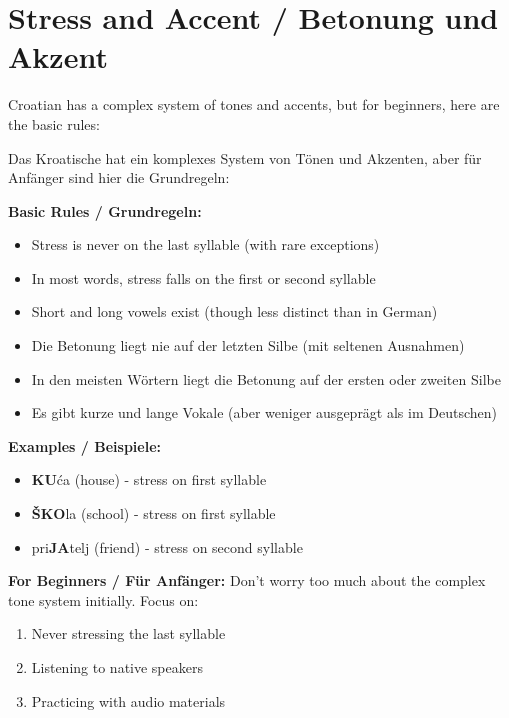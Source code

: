 \section{Stress and Accent / Betonung und Akzent}

\begin{tcolorbox}[colback=white, colframe=croatianred, title=\textbf{Word Stress / Wortbetonung}]

Croatian has a complex system of tones and accents, but for beginners, here are the basic rules:

Das Kroatische hat ein komplexes System von Tönen und Akzenten, aber für Anfänger sind hier die Grundregeln:

\textbf{Basic Rules / Grundregeln:}
\begin{itemize}
    \item Stress is never on the last syllable (with rare exceptions)
    \item In most words, stress falls on the first or second syllable
    \item Short and long vowels exist (though less distinct than in German)
    \item Die Betonung liegt nie auf der letzten Silbe (mit seltenen Ausnahmen)
    \item In den meisten Wörtern liegt die Betonung auf der ersten oder zweiten Silbe
    \item Es gibt kurze und lange Vokale (aber weniger ausgeprägt als im Deutschen)
\end{itemize}

\textbf{Examples / Beispiele:}
\begin{itemize}
    \item \textbf{KU}ća (house) - stress on first syllable
    \item \textbf{ŠKO}la (school) - stress on first syllable
    \item pri\textbf{JA}telj (friend) - stress on second syllable
\end{itemize}

\textbf{For Beginners / Für Anfänger:}
Don't worry too much about the complex tone system initially. Focus on:
\begin{enumerate}
    \item Never stressing the last syllable
    \item Listening to native speakers
    \item Practicing with audio materials
\end{enumerate}

\end{tcolorbox}

